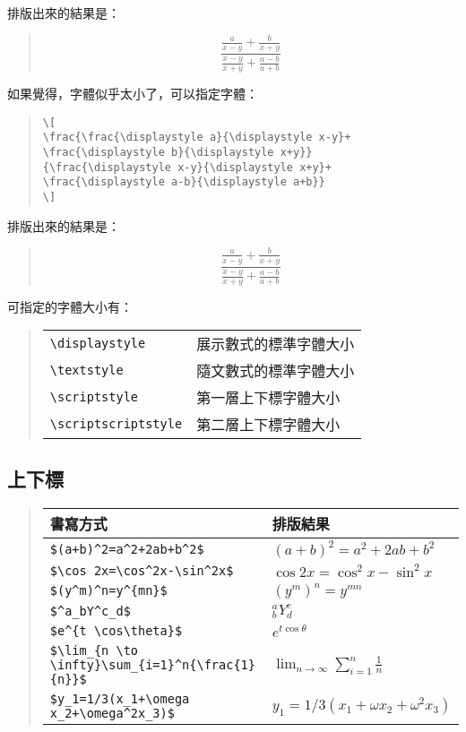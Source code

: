 排版出來的結果是：
\begin{quote}
  \[
    \frac{\frac{a}{x-y}+\frac{b}{x+y}}{\frac{x-y}{x+y}+\frac{a-b}{a+b}}
  \]
\end{quote}
如果覺得，字體似乎太小了，可以指定字體：

\begin{quote}
  \begin{verbatim}
\[
\frac{\frac{\displaystyle a}{\displaystyle x-y}+
\frac{\displaystyle b}{\displaystyle x+y}}
{\frac{\displaystyle x-y}{\displaystyle x+y}+
\frac{\displaystyle a-b}{\displaystyle a+b}}
\]
\end{verbatim}
\end{quote}

排版出來的結果是：
\begin{quote}
  \[
    \frac{\frac{\displaystyle a}{\displaystyle x-y}+
      \frac{\displaystyle b}{\displaystyle x+y}}
    {\frac{\displaystyle x-y}{\displaystyle x+y}+
      \frac{\displaystyle a-b}{\displaystyle a+b}}
  \]
\end{quote}
可指定的字體大小有：

\begin{quote}
  \begin{tabular}{ll}
    \verb|\displaystyle| & 展示數式的標準字體大小 \\
    \verb|\textstyle| & 隨文數式的標準字體大小 \\
    \verb|\scriptstyle| & 第一層上下標字體大小   \\
    \verb|\scriptscriptstyle| & 第二層上下標字體大小
  \end{tabular}
\end{quote}


\subsection{上下標}

\begin{quote}
  \begin{tabular}{ll}
    書寫方式                & 排版結果                                       \\
    \hline
    \verb|$(a+b)^2=a^2+2ab+b^2$| & $(a+b)^2=a^2+2ab+b^2$                          \\
    \verb|$\cos 2x=\cos^2x-\sin^2x$| & $\cos 2x=\cos^2x-\sin^2x$                      \\
    \verb|$(y^m)^n=y^{mn}$| & $(y^m)^n=y^{mn}$                               \\
    \verb|$^a_bY^c_d$| & $^a_bY^c_d$                                    \\
    \verb|$e^{t \cos\theta}$| & $e^{t \cos\theta}$                             \\
    \verb|$\lim_{n \to \infty}\sum_{i=1}^n{\frac{1}{n}}$| & $\lim_{n \to \infty}\sum_{i=1}^n{\frac{1}{n}}$ \\
    \verb|$y_1=1/3(x_1+\omega x_2+\omega^2x_3)$| & $y_1=1/3(x_1+\omega x_2+\omega^2x_3)$
  \end{tabular}
\end{quote}

